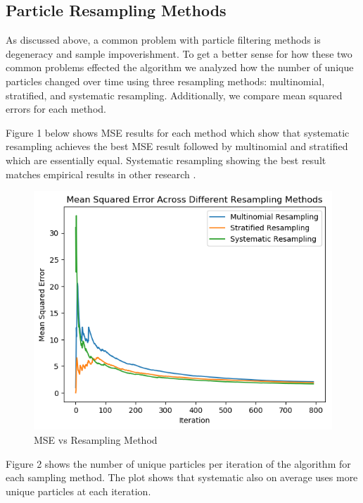 \documentclass{article}
\begin{document}
\subsection{Particle Resampling Methods}

As discussed above, a common problem with particle filtering methods is degeneracy and sample impoverishment. To get a better sense for how these two common problems effected the algorithm we analyzed how the number of unique particles changed over time using three resampling methods: multinomial, stratified, and systematic resampling. Additionally, we compare mean squared errors for each method. 

Figure 1 below shows MSE results for each method which show that systematic resampling achieves the best MSE result followed by multinomial and stratified which are essentially equal. Systematic resampling showing the best result matches empirical results in other research \cite{doucet2009tutorial}.

\begin{figure}[ht]
\begin{center}
\centerline{\includegraphics[width=\columnwidth]{mse_resample}}
\caption{MSE vs Resampling Method}
\label{MSEResampling}
\end{center}
\vskip -0.4in
\end{figure}

Figure 2 shows the number of unique particles per iteration of the algorithm for each sampling method. The plot shows that systematic also on average uses more unique particles at each iteration. 
\end{document}
